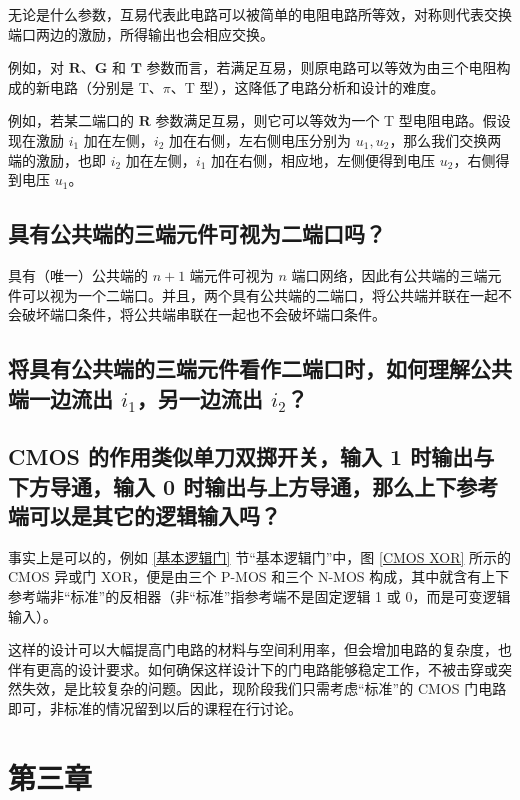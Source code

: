 \documentclass[UTF8]{report}
\theoremstyle{MyLineTheoremStyle} %
\theoremstyle{MyBlockTheoremStyle} %
\theoremstyle{MySubsubsectionStyle} %
\begin{document}
无论是什么参数，互易代表此电路可以被简单的电阻电路所等效，对称则代表交换端口两边的激励，所得输出也会相应交换。

例如，对 $\boldsymbol{R}$、$\boldsymbol{G}$ 和 $\boldsymbol{T}$ 参数而言，若满足互易，则原电路可以等效为由三个电阻构成的新电路（分别是 T、$\pi$、T 型），这降低了电路分析和设计的难度。

例如，若某二端口的 $\boldsymbol{R}$ 参数满足互易，则它可以等效为一个 T 型电阻电路。假设现在激励 $i_1$ 加在左侧，$i_2$ 加在右侧，左右侧电压分别为 $u_1, u_2$，那么我们交换两端的激励，也即 $i_2$ 加在左侧，$i_1$ 加在右侧，相应地，左侧便得到电压 $u_2$，右侧得到电压 $u_1$。

\subsection{具有公共端的三端元件可视为二端口吗？}

具有（唯一）公共端的 $n+1$ 端元件可视为 $n$ 端口网络，因此有公共端的三端元件可以视为一个二端口。并且，两个具有公共端的二端口，将公共端并联在一起不会破坏端口条件，将公共端串联在一起也不会破坏端口条件。

\subsection{将具有公共端的三端元件看作二端口时，如何理解公共端一边流出 $i_1$，另一边流出 $i_2$？}

\subsection{CMOS 的作用类似单刀双掷开关，输入 1 时输出与下方导通，输入 0 时输出与上方导通，那么上下参考端可以是其它的逻辑输入吗？}

事实上是可以的，例如 \ref{基本逻辑门} 节“基本逻辑门”中，图 \ref{CMOS XOR} 所示的 CMOS 异或门 XOR，便是由三个 P-MOS 和三个 N-MOS 构成，其中就含有上下参考端非“标准”的反相器（非“标准”指参考端不是固定逻辑 1 或 0，而是可变逻辑输入）。

这样的设计可以大幅提高门电路的材料与空间利用率，但会增加电路的复杂度，也伴有更高的设计要求。如何确保这样设计下的门电路能够稳定工作，不被击穿或突然失效，是比较复杂的问题。因此，现阶段我们只需考虑“标准”的 CMOS 门电路即可，非标准的情况留到以后的课程在行讨论。


\section{第三章}
\end{document}
